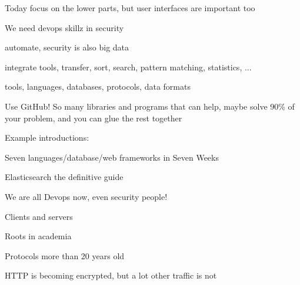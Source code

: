\documentclass[Screen16to9,17pt]{foils}
\begin{document}
\centerline{Today focus on the lower parts, but user interfaces are important too}


\begin{list1}
\item We need devops skillz in security
\item automate, security is also big data
\item integrate tools, transfer, sort, search, pattern matching, statistics, ...
\item tools, languages, databases, protocols, data formats
\item Use GitHub! So many libraries and programs that can help, maybe solve  90\% of your problem, and you can glue the rest together
\item Example introductions:
\begin{list2}
\item Seven languages/database/web frameworks in Seven Weeks
\item Elasticsearch the definitive guide
\end{list2}
\end{list1}

\centerline{We are all Devops now, even security people!}





\begin{list1}
\item Clients and servers
\item Roots in academia
\item Protocols more than 20 years old
\item HTTP is becoming encrypted, but a lot other traffic is not
\end{list1}





\centerline{}



\end{document}
